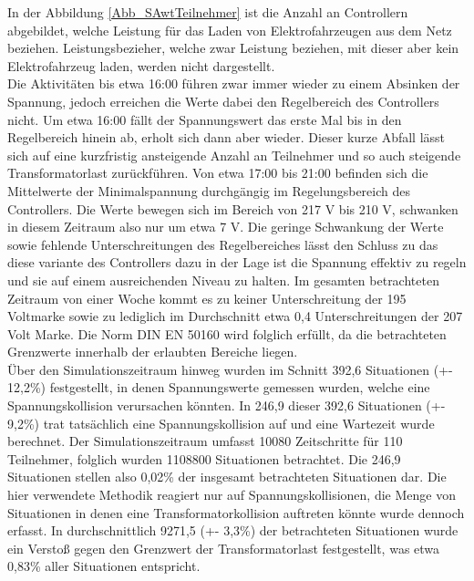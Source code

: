 In der Abbildung \ref{Abb_SAwtTeilnehmer} ist die Anzahl an Controllern abgebildet, welche Leistung für das Laden von Elektrofahrzeugen aus dem Netz beziehen. Leistungsbezieher, welche zwar Leistung beziehen, mit dieser aber kein Elektrofahrzeug laden, werden nicht dargestellt. \\
Die Aktivitäten bis etwa 16:00 führen zwar immer wieder zu einem Absinken der Spannung, jedoch erreichen die Werte dabei den Regelbereich des Controllers nicht. Um etwa 16:00 fällt der Spannungswert das erste Mal bis in den Regelbereich hinein ab, erholt sich dann aber wieder. Dieser kurze Abfall lässt sich auf eine kurzfristig ansteigende Anzahl an Teilnehmer und so auch steigende Transformatorlast zurückführen. Von etwa 17:00 bis 21:00 befinden sich die Mittelwerte der Minimalspannung durchgängig im Regelungsbereich des Controllers. Die Werte bewegen sich im Bereich von 217 V bis 210 V, schwanken in diesem Zeitraum also nur um etwa 7 V. Die geringe Schwankung der Werte sowie fehlende Unterschreitungen des Regelbereiches lässt den Schluss zu das diese variante des Controllers dazu in der Lage ist die Spannung effektiv zu regeln und sie auf einem ausreichenden Niveau zu halten.
Im gesamten betrachteten Zeitraum von einer Woche kommt es zu keiner Unterschreitung der 195 Voltmarke sowie zu lediglich im Durchschnitt etwa 0,4 Unterschreitungen der 207 Volt Marke. Die Norm DIN EN 50160 wird folglich erfüllt, da die betrachteten Grenzwerte innerhalb der erlaubten Bereiche liegen.\\
Über den Simulationszeitraum hinweg wurden im Schnitt 392,6 Situationen (+- 12,2\%) festgestellt, in denen Spannungswerte gemessen wurden, welche eine Spannungskollision verursachen könnten. In 246,9 dieser 392,6 Situationen (+- 9,2\%) trat tatsächlich eine Spannungskollision auf und eine Wartezeit wurde berechnet. Der Simulationszeitraum umfasst 10080 Zeitschritte für 110 Teilnehmer, folglich wurden 1108800 Situationen betrachtet. Die 246,9 Situationen stellen also 0,02\% der insgesamt betrachteten Situationen dar. Die hier verwendete Methodik reagiert nur auf Spannungskollisionen, die Menge von Situationen in denen eine Transformatorkollision auftreten könnte wurde dennoch erfasst. In durchschnittlich 9271,5 (+- 3,3\%) der betrachteten Situationen wurde ein Verstoß gegen den Grenzwert der Transformatorlast festgestellt, was etwa 0,83\% aller Situationen entspricht.\\
